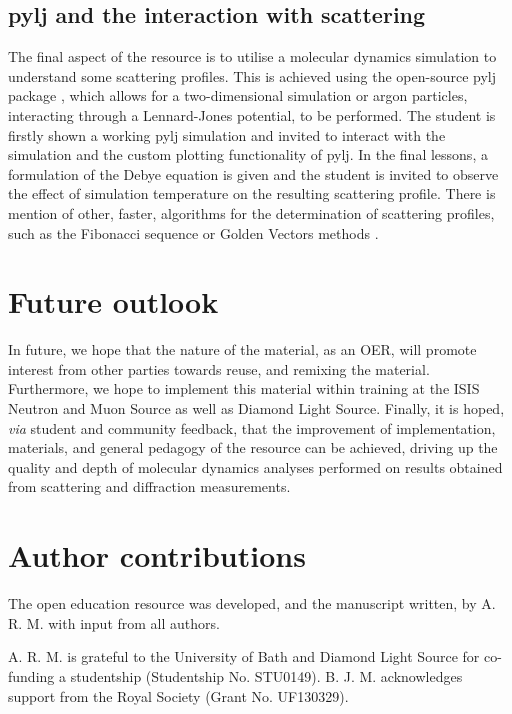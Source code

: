 \documentclass[amsmath,amssymb,twocolumn,superscriptaddress]{revtex4-1}
\begin{document}
\subsection{pylj and the interaction with scattering}

The final aspect of the resource is to utilise a molecular dynamics simulation to understand some scattering profiles.
This is achieved using the open-source pylj package \cite{mccluskey_pylj_2018}, which allows for a two-dimensional simulation or argon particles, interacting through a Lennard-Jones potential, to be performed.
The student is firstly shown a working pylj simulation and invited to interact with the simulation and the custom plotting functionality of pylj.
In the final lessons, a formulation of the Debye equation \cite{debye_zerstreuung_1915} is given and the student is invited to observe the effect of simulation temperature on the resulting scattering profile.
There is mention of other, faster, algorithms for the determination of scattering profiles, such as the Fibonacci sequence or Golden Vectors methods \cite{svergun_solution_1994,watson_rapid_2013}.

\section{Future outlook}

In future, we hope that the nature of the material, as an OER, will promote interest from other parties towards reuse, and remixing the material.
Furthermore, we hope to implement this material within training at the ISIS Neutron and Muon Source as well as Diamond Light Source.
Finally, it is hoped, \textit{via} student and community feedback, that the improvement of implementation, materials, and general pedagogy of the resource can be achieved, driving up the quality and depth of molecular dynamics analyses performed on results obtained from scattering and diffraction measurements.

\section{Author contributions}

The open education resource was developed, and the manuscript written, by A. R. M. with input from all authors. 

\begin{acknowledgements}
A. R. M. is grateful to the University of Bath and Diamond Light Source for co-funding a studentship (Studentship No. STU0149).
B. J. M. acknowledges support from the Royal Society (Grant No. UF130329).
\end{acknowledgements}


\end{document}
